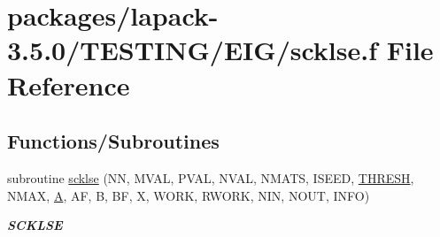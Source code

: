 \hypertarget{scklse_8f}{}\section{packages/lapack-\/3.5.0/\+T\+E\+S\+T\+I\+N\+G/\+E\+I\+G/scklse.f File Reference}
\label{scklse_8f}
\subsection*{Functions/\+Subroutines}
\begin{DoxyCompactItemize}
\item 
subroutine \hyperlink{group__single__eig_gab468002a1d34c94fa7185710bac534a3}{scklse} (N\+N, M\+V\+A\+L, P\+V\+A\+L, N\+V\+A\+L, N\+M\+A\+T\+S, I\+S\+E\+E\+D, \hyperlink{zlaqgs_8c_a0656018abfc9fa2821827415f5d5ea57}{T\+H\+R\+E\+S\+H}, N\+M\+A\+X, \hyperlink{classA}{A}, A\+F, B, B\+F, X, W\+O\+R\+K, R\+W\+O\+R\+K, N\+I\+N, N\+O\+U\+T, I\+N\+F\+O)
\begin{DoxyCompactList}\small\item\em {\bfseries S\+C\+K\+L\+S\+E} \end{DoxyCompactList}\end{DoxyCompactItemize}
